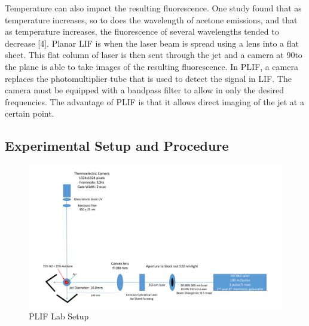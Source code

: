 \documentclass[preview,12pt]{article}
\begin{document}
\indent Temperature can also impact the resulting fluorescence.  One study found that as temperature increases, so to does the wavelength of acetone emissions, and that as temperature increases, the fluorescence of several wavelengths tended to decrease [4].
\newline
\indent Planar LIF is when the laser beam is spread using a lens into a flat sheet.  This flat column of laser is then sent through the jet and a camera at 90\degree to the plane is able to take images of the resulting fluorescence.  In PLIF, a camera replaces the photomultiplier tube that is used to detect the signal in LIF.  The camera must be equipped with a bandpass filter to allow in only the desired frequencies. The advantage of PLIF is that it allows direct imaging of the jet at a certain point. 
\newpage

\begin{center}
    \section*{Experimental Setup and Procedure}
\end{center}

\begin{figure}[h]
    \centering
    \includegraphics[width=\linewidth]{Lab3Diagram.pdf}
    \caption{{\footnotesize PLIF Lab Setup}}
\end{figure}
\end{document}
